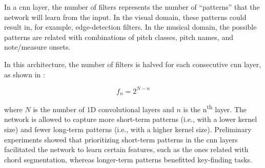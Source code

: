 
In a \gls{cnn} layer, the number of filters represents the
number of ``patterns'' that the network will learn from the
input. In the visual domain, these patterns could result in,
for example, edge-detection filters. In the musical domain,
the possible patterns are related with combinations of pitch
classes, pitch names, and note/measure onsets.

In this architecture, the number of filters is halved for
each consecutive \gls{cnn} layer, as shown in
:

\begin{equation}
    \label{eq:number_of_filters}
    f_n = 2^{N - n}
\end{equation}

where $N$ is the number of 1D convolutional layers and $n$
is the n\textsuperscript{th} layer. The network is allowed
to capture more short-term patterns (i.e., with a lower
kernel size) and fewer long-term patterns (i.e., with a
higher kernel size). Preliminary experiments showed that
prioritizing short-term patterns in the \gls{cnn} layers
facilitated the network to learn certain features, such as
the ones related with chord segmentation, whereas
longer-term patterns benefitted key-finding tasks.

